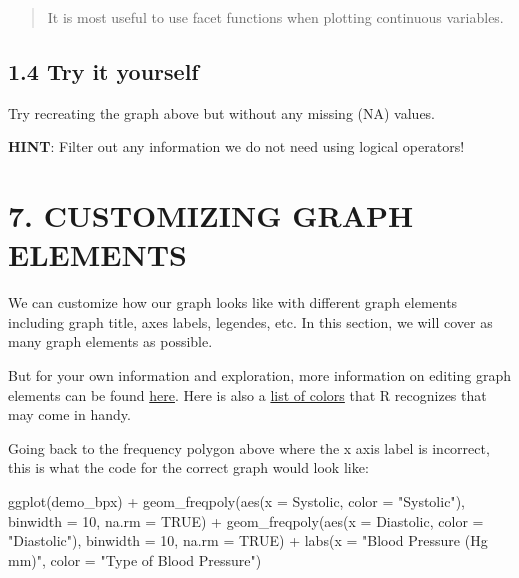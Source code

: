 \documentclass[
]{book}
\newenvironment{Shaded}{\begin{snugshade}}{\end{snugshade}}
\newcommand{\AttributeTok}[1]{\textcolor[rgb]{0.77,0.63,0.00}{#1}}
\newcommand{\ConstantTok}[1]{\textcolor[rgb]{0.00,0.00,0.00}{#1}}
\newcommand{\DecValTok}[1]{\textcolor[rgb]{0.00,0.00,0.81}{#1}}
\newcommand{\FunctionTok}[1]{\textcolor[rgb]{0.00,0.00,0.00}{#1}}
\newcommand{\NormalTok}[1]{#1}
\newcommand{\SpecialCharTok}[1]{\textcolor[rgb]{0.00,0.00,0.00}{#1}}
\newcommand{\StringTok}[1]{\textcolor[rgb]{0.31,0.60,0.02}{#1}}
\begin{document}
\begin{quote}
It is most useful to use facet functions when plotting continuous variables.
\end{quote}

\hypertarget{try-it-yourself-26}{%
\subsection{1.4 Try it yourself}\label{try-it-yourself-26}}

Try recreating the graph above but without any missing (NA) values.

\textbf{HINT}: Filter out any information we do not need using logical operators!

\hypertarget{customizing-graph-elements}{%
\section{7. CUSTOMIZING GRAPH ELEMENTS}\label{customizing-graph-elements}}

We can customize how our graph looks like with different graph elements including graph title, axes labels, legendes, etc. In this section, we will cover as many graph elements as possible.

But for your own information and exploration, more information on editing graph elements can be found \href{http://environmentalcomputing.net/plotting-with-ggplot-adding-titles-and-axis-names/}{here}. Here is also a \href{http://www.stat.columbia.edu/~tzheng/files/Rcolor.pdf}{list of colors} that R recognizes that may come in handy.

Going back to the frequency polygon above where the x axis label is incorrect, this is what the code for the correct graph would look like:

\begin{Shaded}
\begin{Highlighting}[]
\FunctionTok{ggplot}\NormalTok{(demo\_bpx) }\SpecialCharTok{+}
    \FunctionTok{geom\_freqpoly}\NormalTok{(}\FunctionTok{aes}\NormalTok{(}\AttributeTok{x =}\NormalTok{ Systolic, }\AttributeTok{color =} \StringTok{"Systolic"}\NormalTok{), }\AttributeTok{binwidth =} \DecValTok{10}\NormalTok{, }\AttributeTok{na.rm =} \ConstantTok{TRUE}\NormalTok{) }\SpecialCharTok{+}
    \FunctionTok{geom\_freqpoly}\NormalTok{(}\FunctionTok{aes}\NormalTok{(}\AttributeTok{x =}\NormalTok{ Diastolic, }\AttributeTok{color =} \StringTok{"Diastolic"}\NormalTok{), }\AttributeTok{binwidth =} \DecValTok{10}\NormalTok{, }\AttributeTok{na.rm =} \ConstantTok{TRUE}\NormalTok{) }\SpecialCharTok{+}
    \FunctionTok{labs}\NormalTok{(}\AttributeTok{x =} \StringTok{"Blood Pressure (Hg mm)"}\NormalTok{, }\AttributeTok{color =} \StringTok{"Type of Blood Pressure"}\NormalTok{)}
\end{Highlighting}
\end{Shaded}
\end{document}
